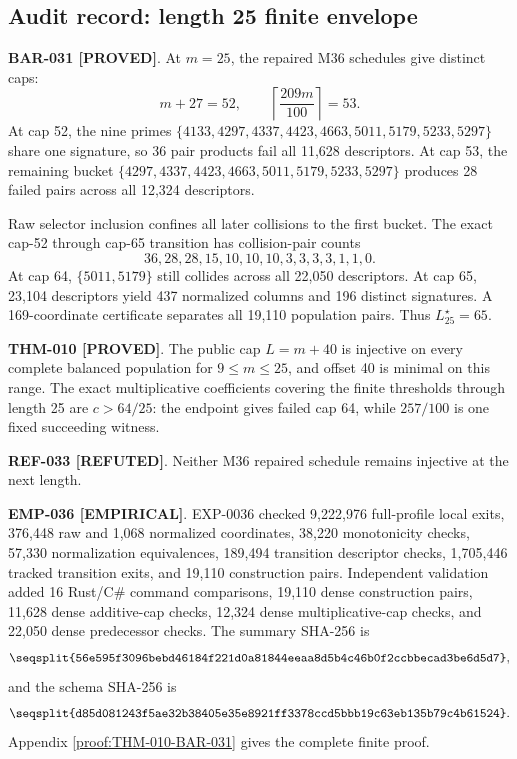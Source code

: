 \documentclass[11pt]{article}
\newcommand{\claimstatus}[2]{\textbf{#1 [#2]}}
\begin{document}
\subsection{Audit record: length 25 finite envelope}

\claimstatus{BAR-031}{PROVED}. At \(m=25\), the repaired M36 schedules give
distinct caps:
\[
m+27=52,\qquad
\left\lceil\frac{209m}{100}\right\rceil=53.
\]
At cap 52, the nine primes
\(\{4133,4297,4337,4423,4663,5011,5179,5233,5297\}\) share one signature,
so 36 pair products fail all 11,628 descriptors. At cap 53, the remaining
bucket \(\{4297,4337,4423,4663,5011,5179,5233,5297\}\) produces 28 failed
pairs across all 12,324 descriptors.

Raw selector inclusion confines all later collisions to the first bucket.
The exact cap-52 through cap-65 transition has collision-pair counts
\[
36,28,28,15,10,10,10,3,3,3,3,1,1,0.
\]
At cap 64, \(\{5011,5179\}\) still collides across all 22,050 descriptors.
At cap 65, 23,104 descriptors yield 437 normalized columns and 196 distinct
signatures. A 169-coordinate certificate separates all
19,110 population pairs. Thus \(L_{25}^\star=65\).

\claimstatus{THM-010}{PROVED}. The public cap \(L=m+40\) is injective on
every complete balanced population for \(9\le m\le25\), and offset 40 is
minimal on this range. The exact multiplicative coefficients covering the
finite thresholds through length 25 are \(c>64/25\): the endpoint gives
failed cap 64, while \(257/100\) is one fixed succeeding witness.

\claimstatus{REF-033}{REFUTED}. Neither M36 repaired schedule remains
injective at the next length.

\claimstatus{EMP-036}{EMPIRICAL}. EXP-0036 checked 9,222,976 full-profile
local exits, 376,448 raw and 1,068 normalized coordinates, 38,220
monotonicity checks, 57,330 normalization equivalences, 189,494 transition
descriptor checks, 1,705,446 tracked transition exits, and 19,110
construction pairs. Independent validation added 16 Rust/C\# command
comparisons, 19,110 dense construction pairs, 11,628 dense additive-cap
checks, 12,324 dense multiplicative-cap checks, and 22,050 dense predecessor
checks. The summary SHA-256 is
\[
\texttt{\seqsplit{56e595f3096bebd46184f221d0a81844eeaa8d5b4c46b0f2ccbbecad3be6d5d7}},
\]
and the schema SHA-256 is
\[
\texttt{\seqsplit{d85d081243f5ae32b38405e35e8921ff3378ccd5bbb19c63eb135b79c4b61524}}.
\]
Appendix \ref{proof:THM-010-BAR-031} gives the complete finite proof.
\end{document}
